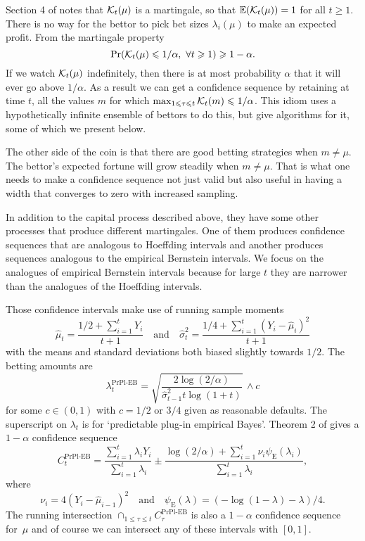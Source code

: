 \documentclass{article}
\renewcommand{\le}{\leqslant}
\renewcommand{\ge}{\geqslant}
\newcommand{\e}{\mathbb{E}}
\newcommand{\prpleb}{\text{PrPl-EB}}
\newcommand{\eb}{\mathrm{E}}
\begin{document}
Section 4 of \cite{WauRam24a} notes that $\mathcal{K}_t(\mu)$ is
a martingale, so that $\e(\ck_t(\mu))=1$ for all $t\ge1$.
There is no way for the bettor to pick bet sizes $\lambda_i(\mu)$
to make an expected profit.    From the martingale
property
$$
\Pr( \ck_t(\mu)\le 1/\alpha,\ \forall t\ge1)\ge1-\alpha.
$$
If we watch $\mathcal{K}_t(\mu)$ indefinitely, then
there is at most probability $\alpha$ that it will
ever go above $1/\alpha$.  As a result we can get
a confidence sequence by retaining at time $t$,
all the values $m$ for 
which $\max_{1\le\tau\le t}\ck_t(m)\le1/\alpha$.
This idiom uses a hypothetically infinite ensemble of 
bettors to do this, but \cite{WauRam24a} give
algorithms for it, some of which we present below.

The other side of the coin is that there are good betting
strategies when $m\ne\mu$.  The bettor's expected fortune
will grow steadily when $m\ne\mu$. That is what one needs
to make a confidence sequence not just valid but also useful
in having a width that converges to zero with increased sampling.

In addition to the capital process described
above, they have some other processes that
produce different martingales. One of them produces confidence
sequences that are analogous to Hoeffding intervals
and another produces sequences analogous to the
empirical Bernstein intervals.  We focus on the analogues 
of empirical Bernstein intervals because for large $t$
they are narrower than the analogues of the Hoeffding intervals.


Those confidence intervals make use of running sample moments
$$
\hat\mu_t = \frac{1/2+\sum_{i=1}^tY_i}{t+1}
\quad\text{and}\quad
\hat\sigma^2_t = \frac{1/4+\sum_{i=1}^t(Y_i-\hat\mu_i)^2}{t+1}
$$
with the means and standard deviations 
both biased slightly towards $1/2$.
The betting amounts are
$$
\lambda_t^\prpleb = \sqrt{\frac{2\log(2/\alpha)}{\hat\sigma^2_{t-1}t\log(1+t)}}\,\wedge c
$$
for some $c\in(0,1)$ with $c=1/2$ or $3/4$
given as reasonable defaults. The superscript on $\lambda_t$ 
is for `predictable plug-in empirical Bayes'.
Theorem 2 of \cite{WauRam24a} 
gives a $1-\alpha$ confidence sequence
$$
C_t^\prpleb = \frac{\sum_{i=1}^t\lambda_iY_i}{\sum_{i=1}^t\lambda_i}
\pm \frac{\log(2/\alpha)+\sum_{i=1}^t\nu_i\psi_{\eb}(\lambda_i)}{\sum_{i=1}^t\lambda_i},
$$
where
$$
\nu_i = 4(Y_i-\hat\mu_{i-1})^2
\quad\text{and}\quad \psi_{\eb}(\lambda)
= (-\log(1-\lambda)-\lambda)/4.
$$
The running intersection
$\cap_{1\le\tau\le t}C^\prpleb_\tau$
is also a $1-\alpha$ confidence sequence for~$\mu$ and
of course we can intersect any of these intervals with $[0,1]$.
\end{document}
